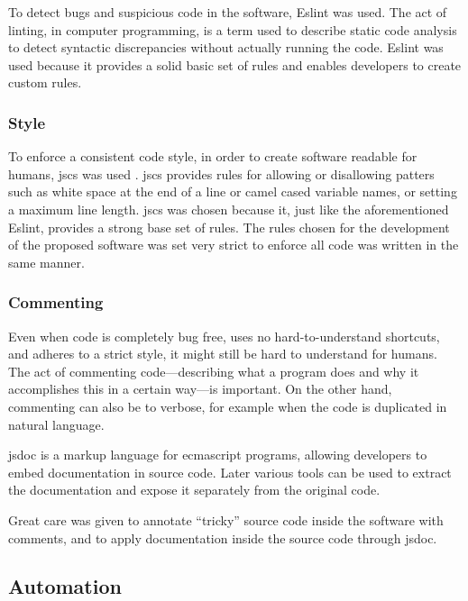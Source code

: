 To detect bugs and suspicious code in the software, Eslint
\autocite{eslint/eslint-source-code} was used. The act of linting, in
computer programming, is a term used to describe static code analysis to
detect syntactic discrepancies without actually running the code. Eslint
was used because it provides a solid basic set of rules and enables
developers to create custom rules.

\subsubsection{Style}\label{style}

To enforce a consistent code style, in order to create software readable
for humans, \gls{jscs} was used
\autocite{mdevils/node-jscs-source-code}. \gls{jscs} provides rules for
allowing or disallowing patters such as white space at the end of a line
or camel cased variable names, or setting a maximum line length.
\gls{jscs} was chosen because it, just like the aforementioned Eslint,
provides a strong base set of rules. The rules chosen for the
development of the proposed software was set very strict to enforce all
code was written in the same manner.

\subsubsection{Commenting}\label{commenting}

Even when code is completely bug free, uses no hard-to-understand
shortcuts, and adheres to a strict style, it might still be hard to
understand for humans. The act of commenting code---describing what a
program does and why it accomplishes this in a certain way---is
important. On the other hand, commenting can also be to verbose, for
example when the code is duplicated in natural language.

\Gls{jsdoc} \autocite{google.com-clojure-compiler-jsdoc} is a markup
language for \gls{ecmascript} programs, allowing developers to embed
documentation in source code. Later various tools can be used to extract
the documentation and expose it separately from the original code.

Great care was given to annotate ``tricky'' source code inside the
software with comments, and to apply documentation inside the source
code through \gls{jsdoc}.

\subsection{Automation}\label{automation}

